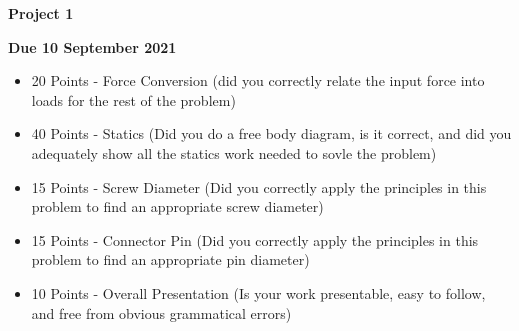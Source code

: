 \documentclass[12pt, oneside]{article}
\begin{document}
\begin{center}
\textbf{\Large Project 1}

\textbf{Due 10 September 2021}
\end{center}

\begin{itemize}
  \item 20 Points - Force Conversion (did you correctly relate the input force into loads for the rest of the problem)
  \item 40 Points - Statics (Did you do a free body diagram, is it correct, and did you adequately show all the statics work needed to sovle the problem)
  \item 15 Points - Screw Diameter (Did you correctly apply the principles in this problem to find an appropriate screw diameter)
  \item 15 Points - Connector Pin (Did you correctly apply the principles in this problem to find an appropriate pin diameter)
  \item 10 Points - Overall Presentation (Is your work presentable, easy to follow, and free from obvious grammatical errors)
\end{itemize}
\end{document}
